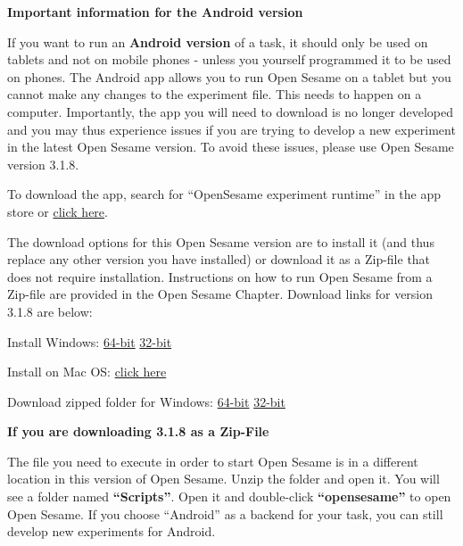 \documentclass[
]{book}
\begin{document}
\textbf{Important information for the Android version}

If you want to run an \textbf{Android version} of a task, it should only be used on tablets and not on mobile phones - unless you yourself programmed it to be used on phones. The Android app allows you to run Open Sesame on a tablet but you cannot make any changes to the experiment file. This needs to happen on a computer. Importantly, the app you will need to download is no longer developed and you may thus experience issues if you are trying to develop a new experiment in the latest Open Sesame version. To avoid these issues, please use Open Sesame version 3.1.8.

To download the app, search for ``OpenSesame experiment runtime'' in the app store or \href{https://play.google.com/store/apps/details?id=nl.cogsci.opensesame}{click here}.

The download options for this Open Sesame version are to install it (and thus replace any other version you have installed) or download it as a Zip-file that does not require installation. Instructions on how to run Open Sesame from a Zip-file are provided in the Open Sesame Chapter. Download links for version 3.1.8 are below:

Install Windows:
\href{https://github.com/smathot/OpenSesame/releases/download/release\%2F3.1.8/opensesame_3.1.8-py3.5-win64-1.exe}{64-bit}
\href{https://github.com/smathot/OpenSesame/releases/download/release\%2F3.1.8/opensesame_3.1.8-py2.7-win32-1.exe}{32-bit}

Install on Mac OS: \href{https://github.com/smathot/OpenSesame/releases/download/release\%2F3.1.8/opensesame_3.1.8-py2.7-macos-1.dmg}{click here}

Download zipped folder for Windows:
\href{https://github.com/smathot/OpenSesame/releases/download/release\%2F3.1.8/opensesame_3.1.8-py3.5-win64-1.zip}{64-bit}
\href{https://github.com/smathot/OpenSesame/releases/download/release\%2F3.1.8/opensesame_3.1.8-py2.7-win32-1.zip}{32-bit}

\textbf{If you are downloading 3.1.8 as a Zip-File}

The file you need to execute in order to start Open Sesame is in a different location in this version of Open Sesame. Unzip the folder and open it. You will see a folder named \textbf{``Scripts''}. Open it and double-click \textbf{``opensesame''} to open Open Sesame. If you choose ``Android'' as a backend for your task, you can still develop new experiments for Android.
\end{document}
